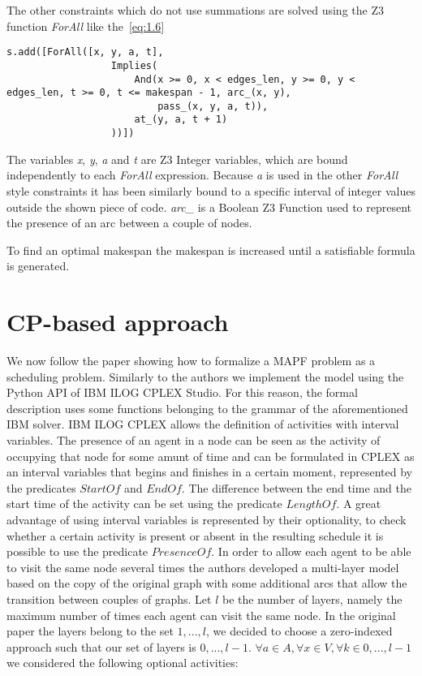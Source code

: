 \documentclass[12pt, a4paper, hidelinks]{article}
\numberwithin{equation}{section}
\begin{document}
The other constraints which do not use summations are solved using the Z3 function \textit{ForAll} like the~\ref{eq:1.6}

\begin{lstlisting}
s.add([ForAll([x, y, a, t],
                  Implies(
                      And(x >= 0, x < edges_len, y >= 0, y < edges_len, t >= 0, t <= makespan - 1, arc_(x, y),
                          pass_(x, y, a, t)),
                      at_(y, a, t + 1)
                  ))])
\end{lstlisting}\label{code:1.6}

The variables \textit{x}, \textit{y}, \textit{a} and \textit{t} are Z3 Integer variables, which are bound independently to each \textit{ForAll} expression.
Because \textit{a} is used in the other \textit{ForAll} style constraints it has been similarly bound to a specific interval of integer values outside the shown piece of code.
\textit{arc\_} is a Boolean Z3 Function used to represent the presence of an arc between a couple of nodes.

To find an optimal makespan the makespan is increased until a satisfiable formula is generated.

\section{CP-based approach}\label{sec:cp-based-approach}

We now follow the paper showing how to formalize a MAPF problem as a scheduling problem.
Similarly to the authors we implement the model using the Python API of IBM ILOG CPLEX Studio.
For this reason, the formal description uses some functions belonging to the grammar of the aforementioned IBM solver.
IBM ILOG CPLEX allows the definition of activities with interval variables.
The presence of an agent in a node can be seen as the activity of occupying that node for some amunt of time and can be formulated in CPLEX as an interval variables that begins and finishes in a certain moment, represented by the predicates $StartOf$ and $EndOf$. 
The difference between the end time and the start time of the activity can be set using the predicate $LengthOf$.
A great advantage of using interval variables is represented by their optionality, to check whether a certain activity is present or absent in the resulting schedule it is possible to use the predicate $PresenceOf$.
In order to allow each agent to be able to visit the same node several times the authors developed a multi-layer model based on the copy of the original graph with some additional arcs that allow the transition between couples of graphs.
Let $l$ be the number of layers, namely the maximum number of times each agent can visit the same node. In the original paper the layers belong to the set ${1,...,l}$, we decided to choose a zero-indexed approach such that our set of layers is ${0,...,l-1}$.
$\forall a \in A, \forall x \in V, \forall k \in {0,...,l-1}$ we considered the following optional activities:
\end{document}
